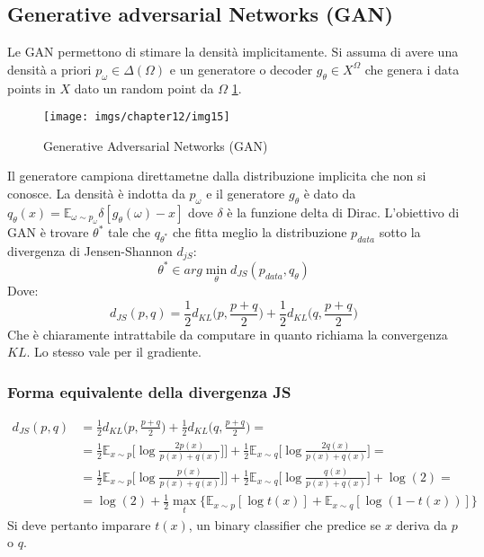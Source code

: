 	\subsection{Generative adversarial Networks (GAN)}
	Le GAN permettono di stimare la densit\`a implicitamente.
	Si assuma di avere una densit\`a a priori $p_\omega\in\Delta(\Omega)$ e un generatore o decoder $g_\theta\in X^\Omega$ che genera i data points in $X$ dato un random point da $\Omega$ \ref{fig:chapter12-15}.
	\begin{figure}
		\centering
		\texttt{[image: imgs/chapter12/img15]}
		\caption{Generative Adversarial Networks (GAN)}
		\label{fig:chapter12-15}
	\end{figure}
	Il generatore campiona direttametne dalla distribuzione implicita che non si conosce.
	La densit\`a \`e indotta da $p_\omega$ e il generatore $g_\theta$ \`e dato da $q_\theta(x) = \mathbb{E}_{\omega\sim p_\omega}\delta[g_\theta(\omega) - x]$ dove $\delta$ \`e la funzione delta di Dirac.
	L'obiettivo di GAN \`e trovare $\theta^*$ tale che $q_{\theta^*}$ che fitta meglio la distribuzione $p_{data}$ sotto la divergenza di Jensen-Shannon $d_{jS}$:
	$$\theta^*\in arg\min\limits_{\theta} d_{JS}(p_{data},q_\theta)$$
	Dove:
	$$d_{JS}(p,q) = \frac{1}{2}d_{KL}\bigl(p,\frac{p+q}{2}\bigr)+\frac{1}{2}d_{KL}\bigl(q,\frac{p+q}{2}\bigr)$$
	Che \`e chiaramente intrattabile da computare in quanto richiama la convergenza $KL$.
	Lo stesso vale per il gradiente.

		\subsubsection{Forma equivalente della divergenza JS}
		\begin{align*}
			d_{JS}(p,q) &= \frac{1}{2}d_{KL}\bigl(p, \frac{p+q}{2}\bigr) + \frac{1}{2}d_{KL}\bigl(q, \frac{p+q}{2}\bigr)=\\
			&=\frac{1}{2}\mathbb{E}_{x\sim p}\bigl[\log\frac{2p(x)}{p(x)+q(x)}]\bigr]+\frac{1}{2}\mathbb{E}_{x\sim q}\bigl[\log\frac{2q(x)}{p(x)+q(x)}\bigr]=\\
			&=\frac{1}{2}\mathbb{E}_{x\sim p}\bigl[\log\frac{p(x)}{p(x)+q(x)}]\bigr]+\frac{1}{2}\mathbb{E}_{x\sim q}\bigl[\log\frac{q(x)}{p(x)+q(x)}\bigr] + \log(2)=\\
			&=\log(2)+\frac{1}{2}\max\limits_t\{\mathbb{E}_{x\sim p}[\log t(x)]+\mathbb{E}_{x\sim q}[\log(1-t(x))]\}
		\end{align*}
		Si deve pertanto imparare $t(x)$, un binary classifier che predice se $x$ deriva da $p$ o $q$.
		
